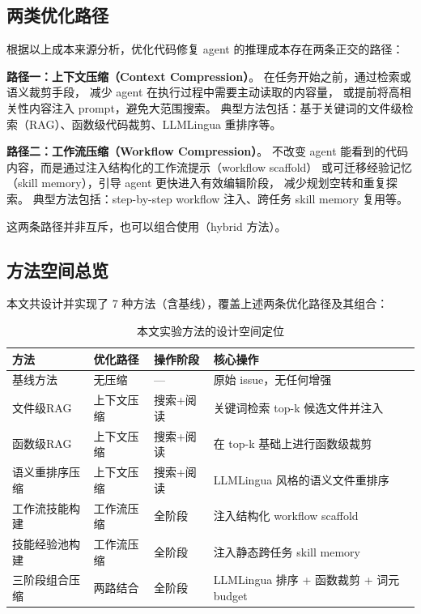 \subsection{两类优化路径}
\label{subsec:two-paths}

根据以上成本来源分析，优化代码修复 agent 的推理成本存在两条正交的路径：

\textbf{路径一：上下文压缩（Context Compression）}。
在任务开始之前，通过检索或语义裁剪手段，
减少 agent 在执行过程中需要主动读取的内容量，
或提前将高相关性内容注入 prompt，避免大范围搜索。
典型方法包括：基于关键词的文件级检索（RAG）、函数级代码裁剪、LLMLingua 重排序等。

\textbf{路径二：工作流压缩（Workflow Compression）}。
不改变 agent 能看到的代码内容，而是通过注入结构化的工作流提示（workflow scaffold）
或可迁移经验记忆（skill memory），引导 agent 更快进入有效编辑阶段，
减少规划空转和重复探索。
典型方法包括：step-by-step workflow 注入、跨任务 skill memory 复用等。

这两条路径并非互斥，也可以组合使用（hybrid 方法）。

\subsection{方法空间总览}
\label{subsec:method-overview}

本文共设计并实现了 7 种方法（含基线），覆盖上述两条优化路径及其组合：

\begin{table}[htbp]
  \centering
  \caption{本文实验方法的设计空间定位}
  \label{tab:method-space}
  \begin{tabularx}{\textwidth}{lllX}
    \toprule
    方法 & 优化路径 & 操作阶段 & 核心操作 \\
    \midrule
    基线方法     & 无压缩 & — & 原始 issue，无任何增强 \\
    文件级RAG      & 上下文压缩 & 搜索+阅读 & 关键词检索 top-k 候选文件并注入 \\
    函数级RAG     & 上下文压缩 & 搜索+阅读 & 在 top-k 基础上进行函数级裁剪 \\
    语义重排序压缩 & 上下文压缩 & 搜索+阅读 & LLMLingua 风格的语义文件重排序 \\
    工作流技能构建  & 工作流压缩 & 全阶段 & 注入结构化 workflow scaffold \\
    技能经验池构建  & 工作流压缩 & 全阶段 & 注入静态跨任务 skill memory \\
    三阶段组合压缩   & 两路结合 & 全阶段 & LLMLingua 排序 + 函数裁剪 + 词元 budget \\
    \bottomrule
  \end{tabularx}
\end{table}

